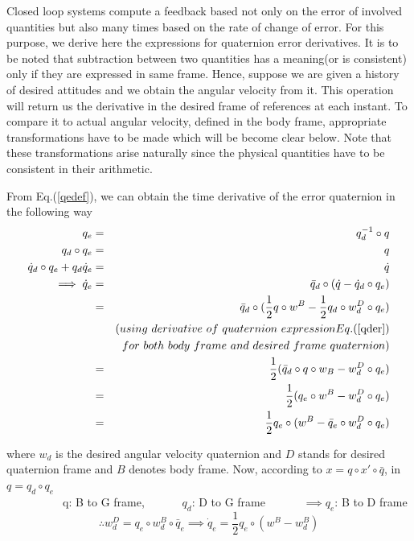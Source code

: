 \documentclass{article}
\begin{document}
	Closed loop systems compute a feedback based not only on the error of involved quantities but also many times based on the rate of change of error. For this purpose, we derive here the expressions for quaternion error derivatives. It is to be noted that subtraction between two quantities has a meaning(or is consistent) only if they are expressed in same frame. Hence, suppose we are given a history of desired attitudes and we obtain the angular velocity from it. This operation will return us the derivative in the desired frame of references at each instant. To compare it to actual angular velocity, defined in the body frame, appropriate transformations have to be made which will be become clear below. Note that these transformations arise naturally since the physical quantities have to be consistent in their arithmetic.
	
	From Eq.(\ref{qedef}), we can obtain the time derivative of the error quaternion in the following way
		\begin{eqnarray}
		q_e &= &q_d^{-1}\circ q\\
		q_d\circ q_e &=& q\\
		\dot{q}_d\circ q_e + q_d\dot{q}_e &=& \dot{q}\\
		\implies \dot{q}_e &=& \bar{q}_d\circ (\dot{q}-\dot{q}_d\circ q_e)\\
		&=& \bar{q}_d\circ ( \frac{1}{2}q\circ w^B - \frac{1}{2}q_d\circ w_d^D\circ q_e )\\
	&&	(using~ derivative~ of~ quaternion~ expressionEq.(\ref{qder})\\
	&& ~for~ both~ body ~frame ~and ~desired~ frame ~quaternion)\\
		&=& \frac{1}{2} (\bar{q}_d\circ q\circ w_B - w_d^D\circ q_e)\\
		&=& \frac{1}{2}(q_e \circ w^B - w_d^D\circ q_e)\\
		&=& \frac{1}{2}q_e\circ (w^B - \bar{q}_e\circ w_d^D\circ q_e)
		\end{eqnarray}
		
		where $w_d$ is the desired angular velocity quaternion and $D$ stands for desired quaternion frame and $B$ denotes body frame.		
		Now, according to $  x = q\circ x'\circ \bar{q} $, in  $ q = q_d\circ q_e $ \\
	\ \  \ \  \ \  \  \ \  \ 	q: B to G frame, \ \ \ \ \ \ 	$ q_d $: D to G frame \ \ \ \ \ \  $ 	\implies q_e $: B to D frame
		\begin{equation}
	\therefore w_d^D = q_e\circ w_d^B \circ \bar{q}_e 
		\implies \dot{q}_e = \frac{1}{2}q_e\circ (w^B - w_d^B)
		\end{equation}		
		
\end{document}

